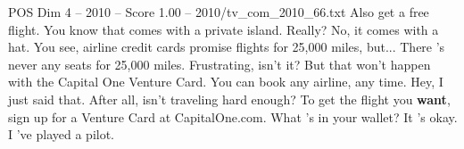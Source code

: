 \begin{textsample}{POS Dim 4 – 2010 – Score 1.00 – 2010/tv\_com\_2010\_66.txt}  \label{ex:f4_pos_056}
Also get a free flight.
You know that comes with a private island.
Really?
No, it comes with a hat.
You see, airline credit cards promise flights for 25,000 miles, but...
There 's never any seats for 25,000 miles.
Frustrating, isn't it?
But that won't happen with the Capital One Venture Card.
You can book any airline, any time.
Hey, I just said that.
After all, isn't traveling hard enough?
To get the flight you \textbf{want}, sign up for a Venture Card at CapitalOne.com.
What 's in your wallet?
It 's okay.
I 've played a pilot.

\end{textsample}
